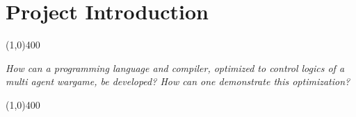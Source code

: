 \chapter{Project Introduction}



\begin{center}
\line(1,0){400}
\end{center}
	\textit{How can a programming language and compiler, optimized to control logics of a multi agent wargame, be developed? How can one demonstrate this optimization?}
\begin{center}
\line(1,0){400}
\end{center}